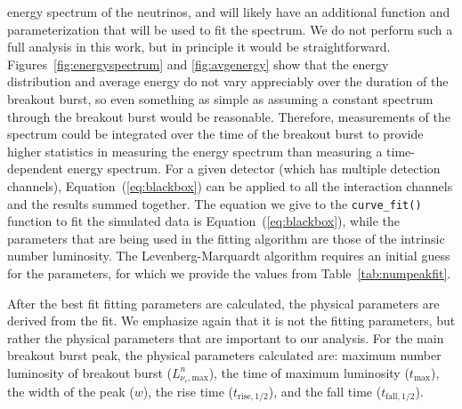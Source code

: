 energy spectrum of the neutrinos, and will likely have an additional
function and parameterization that will be used to fit the spectrum.
We do not perform such a full analysis in this work, but in principle
it would be straightforward. Figures~\ref{fig:energyspectrum}
and \ref{fig:avgenergy} show that the energy distribution and average
energy do not vary appreciably over the duration of the breakout
burst, so even something as simple as assuming a constant spectrum
through the breakout burst would be reasonable.  
Therefore, measurements of the spectrum could be integrated over
the time of the breakout burst to provide higher statistics in
measuring the energy spectrum than measuring a time-dependent
energy spectrum.  
For a given detector (which has
multiple detection channels), Equation~(\ref{eq:blackbox}) can be applied
to all the interaction channels and the results summed together.
The equation we give to
the \texttt{curve\_fit()} function to fit the simulated data is
Equation~(\ref{eq:blackbox}), while the parameters that are being used
in the fitting algorithm are those of the intrinsic number
luminosity. 
The Levenberg-Marquardt algorithm requires an initial guess for the
parameters, for which we provide the values from
Table~\ref{tab:numpeakfit}.

After the best fit fitting parameters are calculated, the physical
parameters are derived from the fit.  
We emphasize again that it is not the fitting parameters, but rather the
physical parameters that are important to
our analysis.  For the main breakout burst peak, the physical parameters
calculated are:
 maximum number luminosity of breakout burst
($L^n_{\nu_e,\mathrm{max}}$),
the time of maximum luminosity ($t_{\mathrm{max}}$), the width of the
peak ($w$),
the rise time ($t_{\mathrm{rise},1/2}$), and the fall time
($t_{\mathrm{fall},1/2}$).  

